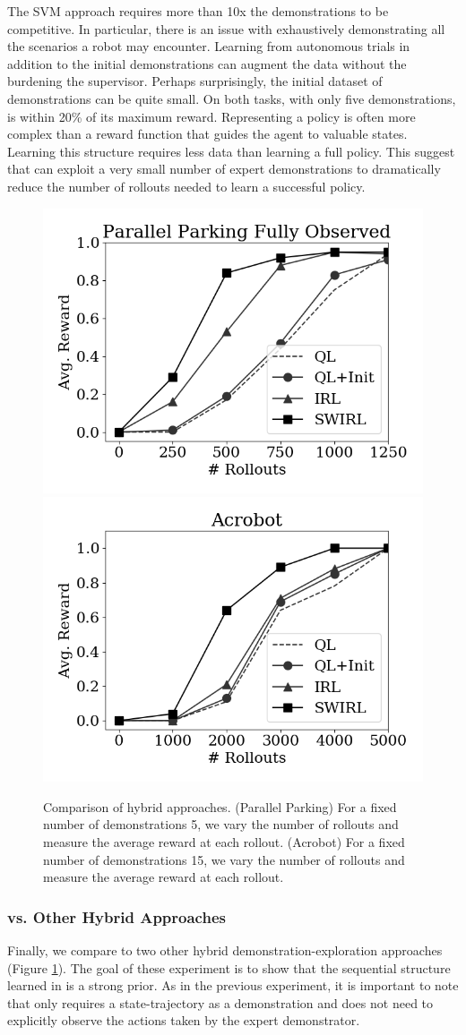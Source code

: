 The SVM approach requires more than 10x the demonstrations to be competitive.
In particular, there is an issue with exhaustively demonstrating all the scenarios a robot may encounter. 
Learning from autonomous trials in addition to the initial demonstrations can augment the data without the burdening the supervisor.
Perhaps surprisingly, the initial dataset of demonstrations can be quite small.
On both tasks, with only five demonstrations, \hirl is within 20\% of its maximum reward. Representing a policy is often more complex than a reward function that guides the agent to valuable states. 
Learning this structure requires less data than learning a full policy.
This suggest that \hirl can exploit a very small number of expert demonstrations to dramatically reduce the number of rollouts needed to learn a successful policy.

\begin{figure}[t]
\centering
 \includegraphics[width=0.48\columnwidth]{swirl-experiments/ppfo-irl1.png}
 \includegraphics[width=0.48\columnwidth]{swirl-experiments/ppfo-irl2.png}
 \caption{Comparison of hybrid approaches. (Parallel Parking) For a fixed number of demonstrations 5, we vary the number of rollouts and measure the average reward at each rollout.  (Acrobot) For a fixed number of demonstrations 15, we vary the number of rollouts and measure the average reward at each rollout. \label{exp:hyb}}
\end{figure}

\subsubsection{\hirl vs. Other Hybrid Approaches}
Finally, we compare \hirl to two other hybrid demonstration-exploration approaches (Figure \ref{exp:hyb}). The goal of these experiment is to show that the sequential structure learned in \hirl is a strong prior. As in the previous experiment, it is important to note that \hirl only requires a state-trajectory as a demonstration and does not need to explicitly observe the actions taken by the expert demonstrator.

